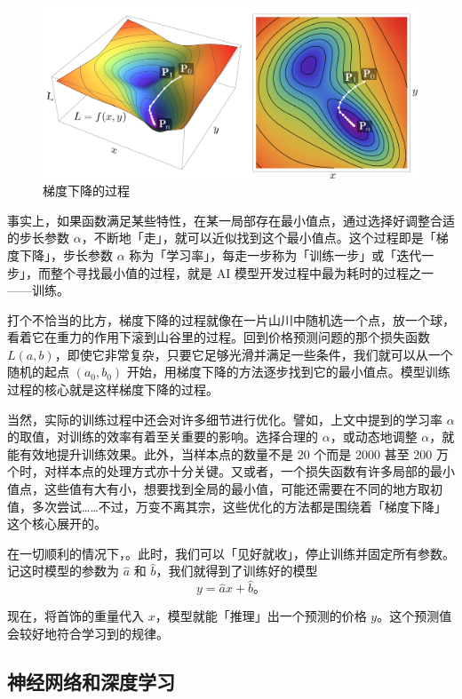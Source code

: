\begin{figure}[htb!]
  \centering
  \includegraphics[width=.7\textwidth]{assets/surpass/GD_3.png}
  \caption{梯度下降的过程}
  \label{fig:GD_3}
\end{figure}

事实上，如果函数满足某些特性，在某一局部存在最小值点，通过选择好调整合适的步长参数 $\alpha$，不断地「走」，就可以近似找到这个最小值点。这个过程即是「梯度下降」，步长参数 $\alpha$ 称为「学习率」，每走一步称为「训练一步」或「迭代一步」，而整个寻找最小值的过程，就是 AI 模型开发过程中最为耗时的过程之一——训练。

打个不恰当的比方，梯度下降的过程就像在一片山川中随机选一个点，放一个球，看着它在重力的作用下滚到山谷里的过程。回到价格预测问题的那个损失函数 $L(a, b)$，即使它非常复杂，只要它足够光滑并满足一些条件，我们就可以从一个随机的起点 $(a_0, b_0)$ 开始，用梯度下降的方法逐步找到它的最小值点。模型训练过程的核心就是这样梯度下降的过程。

\begin{note}
  当然，实际的训练过程中还会对许多细节进行优化。譬如，上文中提到的学习率 $\alpha$ 的取值，对训练的效率有着至关重要的影响。选择合理的 $\alpha$，或动态地调整 $\alpha$，就能有效地提升训练效果。此外，当样本点的数量不是 20 个而是 2000 甚至 200 万个时，对样本点的处理方式亦十分关键。又或者，一个损失函数有许多局部的最小值点，这些值有大有小，想要找到全局的最小值，可能还需要在不同的地方取初值，多次尝试……不过，万变不离其宗，这些优化的方法都是围绕着「梯度下降」这个核心展开的。
\end{note}

在一切顺利的情况下，。此时，我们可以「见好就收」，停止训练并固定所有参数。记这时模型的参数为 $\hat{a}$ 和 $\hat{b}$，我们就得到了训练好的模型
\[
y = \hat{a}x + \hat{b}\text{。}
\]

现在，将首饰的重量代入 $x$，模型就能「推理」出一个预测的价格 $y$。这个预测值会较好地符合学习到的规律。

\subsection{神经网络和深度学习}

